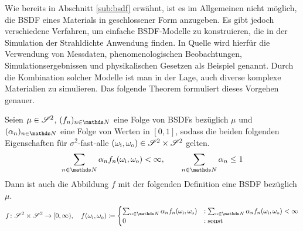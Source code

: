 		Wie bereits in Abschnitt \ref{sub:bsdf} erwähnt, ist es im Allgemeinen nicht möglich, die BSDF eines Materials in geschlossener Form anzugeben.
		Es gibt jedoch verschiedene Verfahren, um einfache BSDF-Modelle zu konstruieren, die in der Simulation der Strahldichte Anwendung finden.
		In Quelle \cite[S.~507~f]{pbrt3} wird hierfür die Verwendung von Messdaten, phenomenologischen Beobachtungen, Simulationsergebnissen und physikalischen Gesetzen als Beispiel genannt.
		Durch die Kombination solcher Modelle ist man in der Lage, auch diverse komplexe Materialien zu simulieren.
		Das folgende Theorem formuliert dieses Vorgehen genauer.
		\begin{theorem*}
			Seien $\mu\in\mathscr{S}^{2}$, $(f_n)_{n\in\SN}$ eine Folge von BSDFs bezüglich $\mu$ und $(\alpha_n)_{n\in\SN}$ eine Folge von Werten in $[0,1]$, sodass die beiden folgenden Eigenschaften für $\sigma^2$-fast-alle $(\omega_{\mathrm{i}},\omega_{\mathrm{o}})\in\mathscr{S}^{2}\times\mathscr{S}^{2}$ gelten.
			\[
				\sum_{n\in\SN}\alpha_n f_n(\omega_\m{i},\omega_\m{o}) < \infty ,\qquad \sum_{n\in\SN}\alpha_n \leq 1
			\]
			Dann ist auch die Abbildung $f$ mit der folgenden Definition eine BSDF bezüglich $\mu$.
			\[
				\func{f}{\ssp\times\ssp}{[0,\infty)},\quad f(\omega_\m{i},\omega_\m{o})\define
				\begin{cases}
					\sum_{n\in\SN}\alpha_n f_n(\omega_\m{i},\omega_\m{o}) &: \sum_{n\in\SN}\alpha_n f_n(\omega_\m{i},\omega_\m{o}) < \infty \\
					0 &: \m{sonst}
				\end{cases}
			\]
		\end{theorem*}
